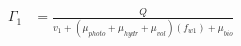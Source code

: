 \documentclass[fleqn, oneside, 11pt]{article}%
\begin{document}
\begin{preview}
\begin{align*}%
\Gamma_{1} & = \frac{Q}{v_{1} + (\mu_{photo} + \mu_{hydr} + \mu_{vol})(f_{w1}) + \mu_{bio}} \nonumber \\
\end{align*} 
\end{preview}
\end{document}
